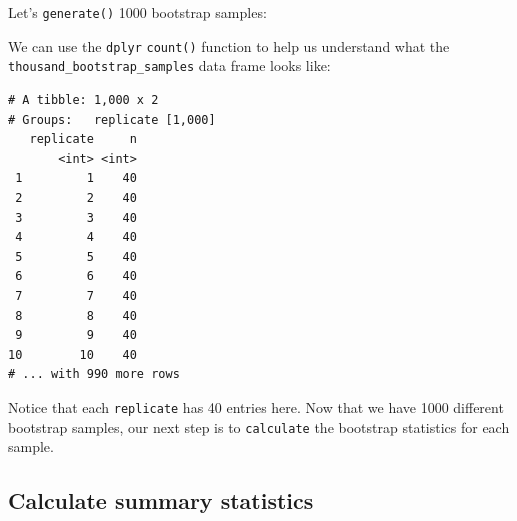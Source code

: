 \documentclass[12pt,]{krantz}
\makeatletter
\newenvironment{Shaded}{\begin{snugshade}}{\end{snugshade}}
\newcommand{\KeywordTok}[1]{\textcolor[rgb]{0.27,0.27,0.27}{\textbf{#1}}}
\newcommand{\DataTypeTok}[1]{\textcolor[rgb]{0.27,0.27,0.27}{#1}}
\newcommand{\DecValTok}[1]{\textcolor[rgb]{0.06,0.06,0.06}{#1}}
\newcommand{\StringTok}[1]{\textcolor[rgb]{0.5,0.5,0.5}{#1}}
\newcommand{\OperatorTok}[1]{\textcolor[rgb]{0.43,0.43,0.43}{\textbf{#1}}}
\newcommand{\NormalTok}[1]{#1}
\newenvironment{kframe}{%
\medskip{}
\setlength{\fboxsep}{.8em}
 \def\at@end@of@kframe{}%
 \ifinner\ifhmode%
  \def\at@end@of@kframe{\end{minipage}}%
  \begin{minipage}{\columnwidth}%
 \fi\fi%
 \def\FrameCommand##1{\hskip\@totalleftmargin \hskip-\fboxsep
 \colorbox{shadecolor}{##1}\hskip-\fboxsep
     \hskip-\linewidth \hskip-\@totalleftmargin \hskip\columnwidth}%
 \MakeFramed {\advance\hsize-\width
   \@totalleftmargin\z@ \linewidth\hsize
   \@setminipage}}%
 {\par\unskip\endMakeFramed%
 \at@end@of@kframe}
\renewenvironment{Shaded}{\begin{kframe}}{\end{kframe}}
\theoremstyle{definition}
\theoremstyle{definition}
\theoremstyle{definition}
\theoremstyle{remark}
\makeatother
\begin{document}
Let's \texttt{generate()} 1000 bootstrap samples:

\begin{Shaded}
\end{Shaded}

We can use the \texttt{dplyr} \texttt{count()} function to help us
understand what the \texttt{thousand\_bootstrap\_samples} data frame
looks like:

\begin{Shaded}
\end{Shaded}

\begin{verbatim}
# A tibble: 1,000 x 2
# Groups:   replicate [1,000]
   replicate     n
       <int> <int>
 1         1    40
 2         2    40
 3         3    40
 4         4    40
 5         5    40
 6         6    40
 7         7    40
 8         8    40
 9         9    40
10        10    40
# ... with 990 more rows
\end{verbatim}

Notice that each \texttt{replicate} has 40 entries here. Now that we
have 1000 different bootstrap samples, our next step is to
\texttt{calculate} the bootstrap statistics for each sample.

\subsection{Calculate summary
statistics}\label{calculate-summary-statistics}
\end{document}

